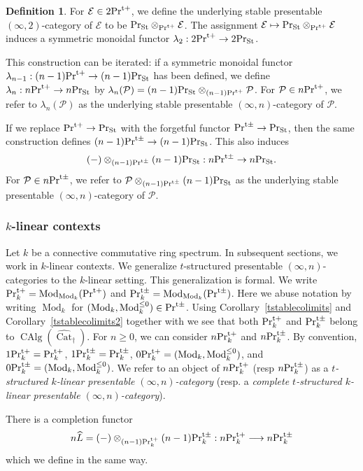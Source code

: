 \documentclass[leqno,12pt]{amsart}
\theoremstyle{plain}
\theoremstyle{definition}
\newtheorem{Definition}[Theorem]{Definition}
\newcommand{\PR}{\textup{Pr}}
\newcommand{\PRTT}{\textup{Pr}^{\textup{t}+}}
\newcommand{\PRTTT}{\textup{Pr}^{\textup{t}\pm}}
\newcommand{\PPP}{\mathcal{P}}
\newcommand{\Mod}{\operatorname{Mod}}
\newcommand{\CAlg}{\operatorname{CAlg}}
\newcommand{\vCat}{\widehat{\operatorname{Cat}}_\dagger}
\newcommand{\PRST}{\PR_{\textup{St}}}
\begin{document}
\begin{Definition}
\label{underlyingdef}
For $\mathcal{E}\in 2\PRTT$, we define the underlying stable presentable $(\infty,2)$-category of $\mathcal{E}$
to be $\PRST\otimes_{\PRTT}\mathcal{E}$.
The assignment $\mathcal{E}\mapsto \PRST\otimes_{\PRTT}\mathcal{E}$ induces
a symmetric monoidal functor $\lambda_2:2\PRTT\to 2\PRST$.

This construction can be iterated:
if a symmetric monoidal functor $\lambda_{n-1}:(n-1)\PRTT\to (n-1)\PRST$
has been defined, we define $\lambda_{n}:n\PRTT\to n\PRST$
by $\lambda_n(\PPP)=(n-1)\PRST\otimes_{(n-1)\PRTT}\mathcal{P}$. 
For $\PPP\in n\PRTT$,
we refer to $\lambda_n(\PPP)$ as the underlying stable presentable $(\infty,n)$-category of $\PPP$.

If we replace $\PRTT\to \PRST$ with the forgetful functor $\PRTTT\to \PRST$,
then the same construction defines $(n-1)\PRTTT\to (n-1)\PRST$. This also induces
\[
(-)\otimes_{(n-1)\PRTTT}(n-1)\PRST :n\PRTTT\to n\PRST.
\]
For $\PPP\in n\PRTTT$,
we refer to $\PPP\otimes_{(n-1)\PRTTT}(n-1)\PRST$ as the underlying stable presentable $(\infty,n)$-category of $\PPP$.
\end{Definition}




\subsubsection{$k$-linear contexts}
Let $k$ be a connective commutative ring spectrum.
In subsequent sections, we work in $k$-linear contexts.
We generalize $t$-structured presentable $(\infty, n)$-categories to the $k$-linear setting.
This generalization is formal. 
We write  $\PRTT_{k}=\Mod_{\Mod_k}(\PRTT)$ and $\PRTTT_{k}=\Mod_{\Mod_k}(\PRTTT)$.
Here we abuse notation by writing $\Mod_k$ for $(\Mod_{k},\Mod_k^{\le0})\in \PRTTT$. 
Using Corollary~\ref{tstablecolimits} and Corollary~\ref{tstablecolimits2} together with \cite[Corollary 4.2.3.5]{HA}
we see that both $\PRTT_k$ and $\PRTTT_k$ belong to $\CAlg(\vCat)$.
For $n\ge0$, we can consider $n\PRTT_k$ and $n\PRTTT_k$. By convention, $1\PRTT_k=\PRTT_k$, $1\PRTTT_k=\PRTTT_k$, $0\PRTT_k=(\Mod_k,\Mod_k^{\le0})$,
 and $0\PRTTT_k=(\Mod_k,\Mod_k^{\le0})$.
We refer to an object of $n\PRTT_k$ (resp $n\PRTTT_k$) as a {\it $t$-structured $k$-linear presentable $(\infty,n)$-category}
(resp. a {\it complete $t$-structured $k$-linear presentable $(\infty,n)$-category}).

There is a completion functor
\[
n\widehat{L}=(-)\otimes_{(n-1)\PRTT_k}(n-1)\PRTTT_k:n\PRTT_k\longrightarrow n\PRTTT_k
\]
which we define in the same way.
\end{document}
